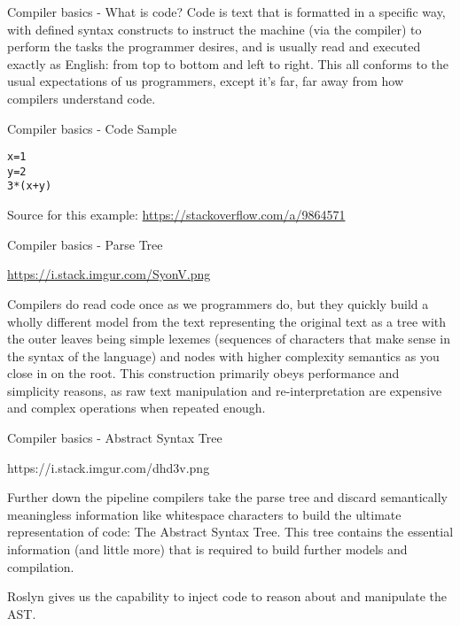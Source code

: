 \documentclass[10pt]{beamer}
\begin{document}
\begin{frame}{Compiler basics - What is code?}
Code is text that is formatted in a specific way, with defined syntax constructs to instruct the machine (via the compiler) to perform the tasks the programmer desires, and is usually read and executed exactly as English: from top to bottom and left to right. This all conforms to the usual expectations of us programmers, except it's far, far away from how compilers understand code.
\end{frame}

\begin{frame}[fragile]{Compiler basics - Code Sample}
\begin{verbatim}
x=1
y=2
3*(x+y)
\end{verbatim}

Source for this example: \url{https://stackoverflow.com/a/9864571}
\end{frame}

\begin{frame}{Compiler basics - Parse Tree}

\url{https://i.stack.imgur.com/SyonV.png}

Compilers do read code once as we programmers do, but they quickly build a wholly different model from the text representing the original text as a tree with the outer leaves being simple lexemes (sequences of characters that make sense in the syntax of the language) and nodes with higher complexity semantics as you close in on the root. This construction primarily obeys performance and simplicity reasons, as raw text manipulation and re-interpretation are expensive and complex operations when repeated enough.
\end{frame}

\begin{frame}{Compiler basics - Abstract Syntax Tree}

https://i.stack.imgur.com/dhd3v.png

Further down the pipeline compilers take the parse tree and discard semantically meaningless information like whitespace characters to build the ultimate representation of code: The Abstract Syntax Tree. This tree contains the essential information (and little more) that is required to build further models and compilation.

Roslyn gives us the capability to inject code to reason about and manipulate the AST.
\end{frame}
\end{document}

